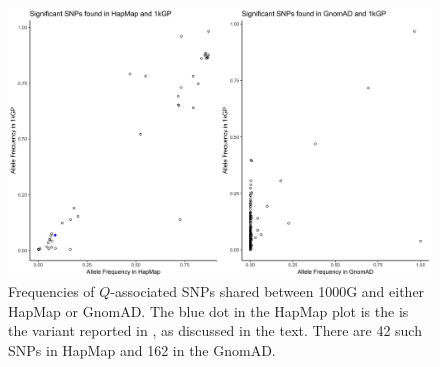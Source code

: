 \documentclass[9pt,lineno]{elife}
\begin{document}
\begin{figure}[h]
\includegraphics[width=\hsize,keepaspectratio]{./Figures/Hap_GnomAD.jpg}
\caption{Frequencies of $Q$-associated SNPs shared between 1000G and either HapMap or GnomAD. The blue dot in the HapMap plot is the is the variant reported in \citep{Mandage2017}, as discussed in the text. There are 42 such SNPs in HapMap and 162 in the GnomAD.}
\label{HapMap_GnomAD}
\end{figure}
\end{document}

